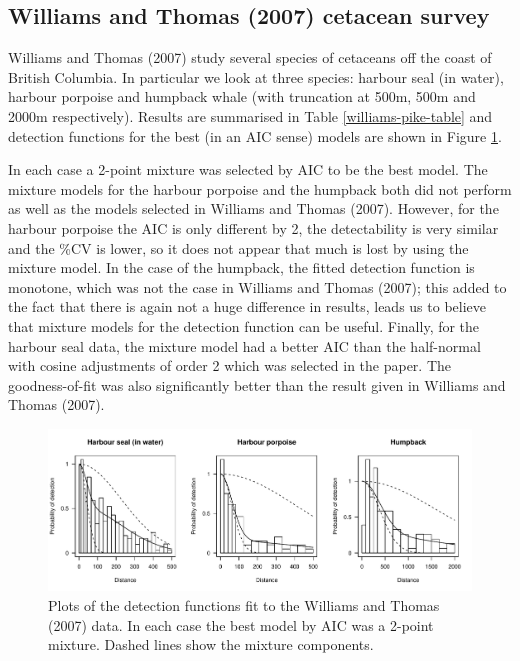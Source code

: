 \documentclass[useAMS,referee]{biom}
\begin{document}
\subsection{Williams and Thomas (2007) cetacean survey}

Williams and Thomas (2007) study several species of cetaceans off the coast of British Columbia. In particular we look at three species: harbour seal (in water), harbour porpoise and humpback whale (with truncation at 500m, 500m and 2000m respectively). Results are summarised in Table \ref{williams-pike-table} and detection functions for the best (in an AIC sense) models are shown in Figure \ref{williams-detfcts}.

In each case a 2-point mixture was selected by AIC to be the best model. The mixture models for the harbour porpoise and the humpback both did not perform as well as the models selected in Williams and Thomas (2007). However, for the harbour porpoise the AIC is only different by 2, the detectability is very similar and the \%CV is lower, so it does not appear that much is lost by using the mixture model. In the case of the humpback, the fitted detection function is monotone, which was not the case in Williams and Thomas (2007); this added to the fact that there is again not a huge difference in results, leads us to believe that mixture models for the detection function can be useful. Finally, for the harbour seal data, the mixture model had a better AIC than the half-normal with cosine adjustments of order 2 which was selected in the paper. The goodness-of-fit was also significantly better than the result given in Williams and Thomas (2007).

\begin{figure}
\centering
\includegraphics[width=\textwidth]{analyses/williamsplots.pdf}
\caption{Plots of the detection functions fit to the Williams and Thomas (2007) data. In each case the best model by AIC was a 2-point mixture. Dashed lines show the mixture components.}
\label{williams-detfcts}
\end{figure}
\end{document}
